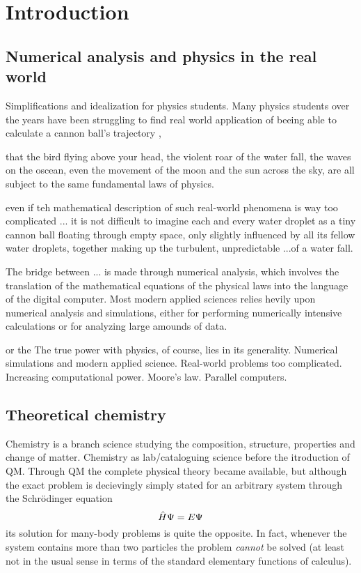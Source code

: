 \chapter{Introduction}

\section{Numerical analysis and physics in the real world}
Simplifications and idealization for physics students.
Many physics students over the years have been struggling to find real world application 
of beeing able to calculate a cannon ball's trajectory ,

that the bird flying above your head, the violent roar of the water fall, the waves on the oscean, even the
movement of the moon and the sun across the sky, are all subject to the same fundamental laws of physics.

even if teh mathematical description of such real-world phenomena is way too complicated ... 
it is not difficult to imagine each and every water droplet as a tiny cannon ball 
floating through empty space, only slightly influenced by all its fellow water droplets, together
making up the turbulent, unpredictable ...of a water fall.

The bridge between ... is made through numerical analysis, which involves the translation of the
mathematical equations of the physical laws into the language of the digital computer.
Most modern applied sciences relies hevily upon numerical analysis and simulations, either for performing
numerically intensive calculations or for analyzing large amounds of data.

or the 
The true power with physics, of course, lies in its generality. 
Numerical simulations and modern applied science.
Real-world problems too complicated.
Increasing computational power. Moore's law. Parallel computers.

\section{Theoretical chemistry}
Chemistry is a branch science studying the composition, structure, properties and change of matter.
Chemistry as lab/cataloguing science before the itroduction of QM.
Through QM the complete physical theory became available, but although
the exact problem is decievingly simply stated for an arbitrary system through the Schr\"{o}dinger equation
\begin{equation}
    \hat{H}\Psi = E\Psi
\end{equation}
its solution for many-body problems is quite the opposite. In fact, whenever the system contains more than 
two particles the problem \emph{cannot} be solved (at least not in the usual sense in terms of the standard 
elementary functions of calculus).





